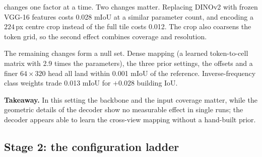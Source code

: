 \documentclass[11pt]{article}
\begin{document}
 changes one factor at a time. Two changes matter. Replacing DINOv2 with frozen VGG-16
features costs 0.028 mIoU at a similar parameter count, and encoding a $224$\,px centre crop instead of the
full tile costs 0.012. The crop also coarsens the token grid, so the second effect combines coverage and
resolution.

The remaining changes form a null set. Dense mapping (a learned token-to-cell matrix with 2.9 times the
parameters), the three prior settings, the offsets and a finer $64\times320$ head all land within 0.001 mIoU of
the reference. Inverse-frequency class weights trade 0.013 mIoU for $+0.028$ building IoU.

\noindent\textbf{Takeaway.} In this setting the backbone and the input coverage matter, while the geometric
details of the decoder show no measurable effect in single runs; the decoder appears able to learn the
cross-view mapping without a hand-built prior.

\subsection{Stage 2: the configuration ladder}
\label{sec:ladder}
\end{document}
